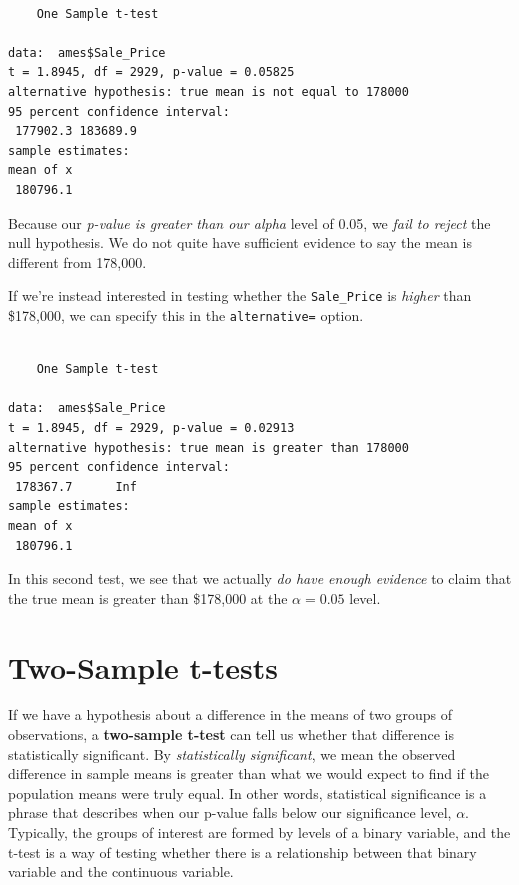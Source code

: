 \documentclass[
  letterpaper,
  DIV=11,
  numbers=noendperiod]{scrreprt}
\newenvironment{Shaded}{\begin{snugshade}}{\end{snugshade}}
\newcommand{\AttributeTok}[1]{\textcolor[rgb]{0.40,0.45,0.13}{#1}}
\newcommand{\DecValTok}[1]{\textcolor[rgb]{0.68,0.00,0.00}{#1}}
\newcommand{\FunctionTok}[1]{\textcolor[rgb]{0.28,0.35,0.67}{#1}}
\newcommand{\NormalTok}[1]{\textcolor[rgb]{0.00,0.23,0.31}{#1}}
\newcommand{\SpecialCharTok}[1]{\textcolor[rgb]{0.37,0.37,0.37}{#1}}
\newcommand{\StringTok}[1]{\textcolor[rgb]{0.13,0.47,0.30}{#1}}
\begin{document}
\begin{verbatim}

    One Sample t-test

data:  ames$Sale_Price
t = 1.8945, df = 2929, p-value = 0.05825
alternative hypothesis: true mean is not equal to 178000
95 percent confidence interval:
 177902.3 183689.9
sample estimates:
mean of x 
 180796.1 
\end{verbatim}

Because our \emph{p-value is greater than our alpha} level of 0.05, we
\emph{fail to reject} the null hypothesis. We do not quite have
sufficient evidence to say the mean is different from 178,000.

If we're instead interested in testing whether the \texttt{Sale\_Price}
is \emph{higher} than \$178,000, we can specify this in the
\texttt{alternative=} option.

\begin{Shaded}
\end{Shaded}

\begin{verbatim}

    One Sample t-test

data:  ames$Sale_Price
t = 1.8945, df = 2929, p-value = 0.02913
alternative hypothesis: true mean is greater than 178000
95 percent confidence interval:
 178367.7      Inf
sample estimates:
mean of x 
 180796.1 
\end{verbatim}

In this second test, we see that we actually \emph{do have enough
evidence} to claim that the true mean is greater than \$178,000 at the
\(\alpha=0.05\) level.

\hypertarget{two-sample-t-tests}{%
\section{Two-Sample t-tests}\label{two-sample-t-tests}}

If we have a hypothesis about a difference in the means of two groups of
observations, a \textbf{two-sample t-test} can tell us whether that
difference is statistically significant. By \emph{statistically
significant}, we mean the observed difference in sample means is greater
than what we would expect to find if the population means were truly
equal. In other words, statistical significance is a phrase that
describes when our p-value falls below our significance level,
\(\alpha\). Typically, the groups of interest are formed by levels of a
binary variable, and the t-test is a way of testing whether there is a
relationship between that binary variable and the continuous variable.
\end{document}
